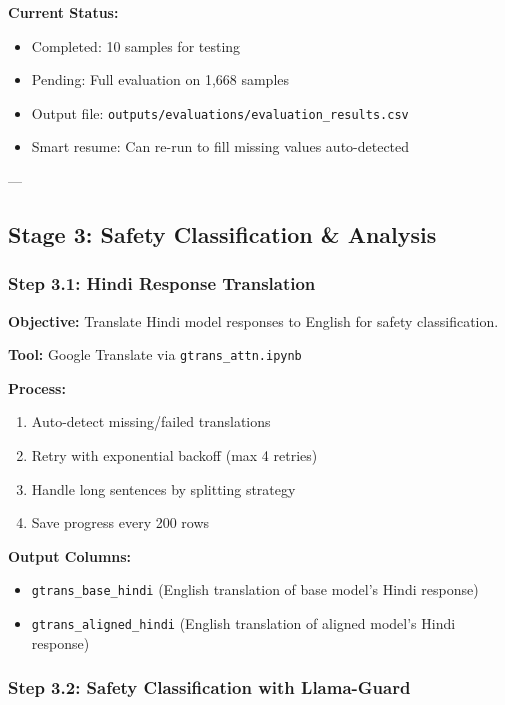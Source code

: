 \documentclass[11pt,a4paper]{article}
\begin{document}
\textbf{Current Status:}
\begin{itemize}
    \item Completed: 10 samples for testing
    \item Pending: Full evaluation on 1,668 samples
    \item Output file: \texttt{outputs/evaluations/evaluation\_results.csv}
    \item Smart resume: Can re-run to fill missing values auto-detected
\end{itemize}

---

\subsection{Stage 3: Safety Classification \& Analysis}

\subsubsection{Step 3.1: Hindi Response Translation}

\textbf{Objective:} Translate Hindi model responses to English for safety classification.

\textbf{Tool:} Google Translate via \texttt{gtrans\_attn.ipynb}

\textbf{Process:}
\begin{enumerate}
    \item Auto-detect missing/failed translations
    \item Retry with exponential backoff (max 4 retries)
    \item  Handle long sentences by splitting strategy
    \item Save progress every 200 rows
\end{enumerate}

\textbf{Output Columns:}
\begin{itemize}
    \item \texttt{gtrans\_base\_hindi} (English translation of base model's Hindi response)
    \item \texttt{gtrans\_aligned\_hindi} (English translation of aligned model's Hindi response)
\end{itemize}

\subsubsection{Step 3.2: Safety Classification with Llama-Guard}
\end{document}
